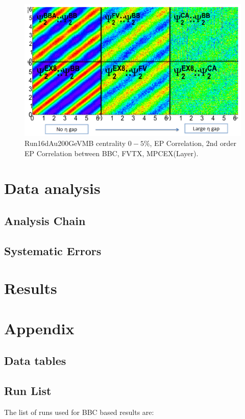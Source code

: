 \documentclass{article}
\begin{document}
\begin{figure}[!htb]
  \centering  
    \includegraphics[width=\textwidth]{fig_pi0vn/ep_correlation.PNG}
  \caption[d+Au200GeVMB centrality $0-5\%$, EP Correlation]{Run16dAu200GeVMB centrality $0-5\%$, EP Correlation, 2nd order EP Correlation between BBC, FVTX, MPCEX(Layer).}
  \label{fig:EP Correlation}
\end{figure}

\section{Data analysis}
\subsection{Analysis Chain}
\subsection{Systematic Errors}
\section{Results}
\section{Appendix}
\subsection{Data tables}
\subsection{Run List}
The list of runs used for BBC based results are:
\end{document}
